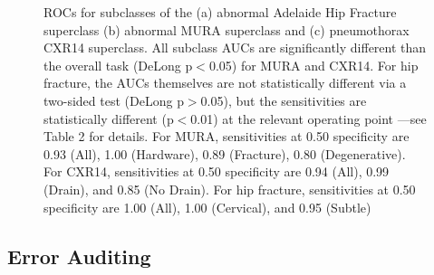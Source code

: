 \documentclass[sigconf,anonymous,review]{acmart}
\begin{document}
 \begin{figure}[htb!]%
\centering
{}%
%
%
\caption{ROCs for subclasses of the (a) abnormal Adelaide Hip Fracture superclass (b) abnormal MURA superclass and (c) pneumothorax CXR14 superclass.  All subclass AUCs are significantly different than the overall task (DeLong p$<$0.05) for MURA and CXR14.  For hip fracture, the AUCs themselves are not statistically different via a two-sided test (DeLong p$>$0.05), but the sensitivities are statistically different (p$<$0.01) at the relevant operating point \citep{Gale_W_Oakden-Rayner_L_Carneiro_G_Bradley_AP_Palmer_LJ2017-tl}---see Table 2 for details. For MURA, sensitivities at 0.50 specificity are 0.93 (All), 1.00 (Hardware), 0.89 (Fracture), 0.80 (Degenerative).  For CXR14, sensitivities at 0.50 specificity are 0.94 (All), 0.99 (Drain), and 0.85 (No Drain).  For hip fracture, sensitivities at 0.50 specificity are 1.00 (All), 1.00 (Cervical), and 0.95 (Subtle)}
\label{fig:rocs}
\end{figure}


\subsection{Error Auditing}
\end{document}
